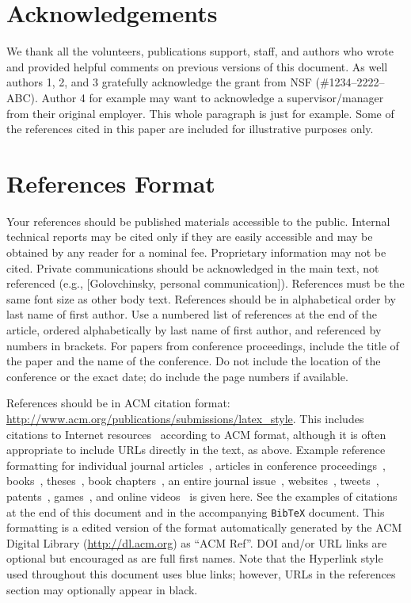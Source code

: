 \documentclass{sigchi-ext}
\begin{document}
\section{Acknowledgements}
We thank all the volunteers, publications support, staff, and authors
who wrote and provided helpful comments on previous versions of this
document. As well authors 1, 2, and 3 gratefully acknowledge the grant
from NSF (\#1234--2222--ABC). Author 4 for example may want to
acknowledge a supervisor/manager from their original employer. This
whole paragraph is just for example. Some of the references cited in
this paper are included for illustrative purposes only.

\section{References Format}
Your references should be published materials accessible to the
public. Internal technical reports may be cited only if they are
easily accessible and may be obtained by any reader for a nominal
fee. Proprietary information may not be cited. Private communications
should be acknowledged in the main text, not referenced (e.g.,
[Golovchinsky, personal communication]). References must be the same
font size as other body text. References should be in alphabetical
order by last name of first author. Use a numbered list of references
at the end of the article, ordered alphabetically by last name of
first author, and referenced by numbers in brackets. For papers from
conference proceedings, include the title of the paper and the name of
the conference. Do not include the location of the conference or the
exact date; do include the page numbers if available. 

References should be in ACM citation format:
\url{http://www.acm.org/publications/submissions/latex_style}.  This
includes citations to Internet
resources~\cite{CHINOSAUR:venue,cavender:writing,psy:gangnam}
according to ACM format, although it is often appropriate to include
URLs directly in the text, as above. Example reference formatting for
individual journal articles~\cite{ethics}, articles in conference
proceedings~\cite{Klemmer:2002:WSC:503376.503378},
books~\cite{Schwartz:1995:GBF}, theses~\cite{sutherland:sketchpad},
book chapters~\cite{winner:politics}, an entire journal
issue~\cite{kaye:puc},
websites~\cite{acm_categories,cavender:writing},
tweets~\cite{CHINOSAUR:venue}, patents~\cite{heilig:sensorama}, 
games~\cite{supermetroid:snes}, and
online videos~\cite{psy:gangnam} is given here.  See the examples of
citations at the end of this document and in the accompanying
\texttt{BibTeX} document. This formatting is a edited version of the
format automatically generated by the ACM Digital Library
(\url{http://dl.acm.org}) as ``ACM Ref''. DOI and/or URL links are
optional but encouraged as are full first names. Note that the
Hyperlink style used throughout this document uses blue links;
however, URLs in the references section may optionally appear in
black.

\balance{} 



\end{document}
